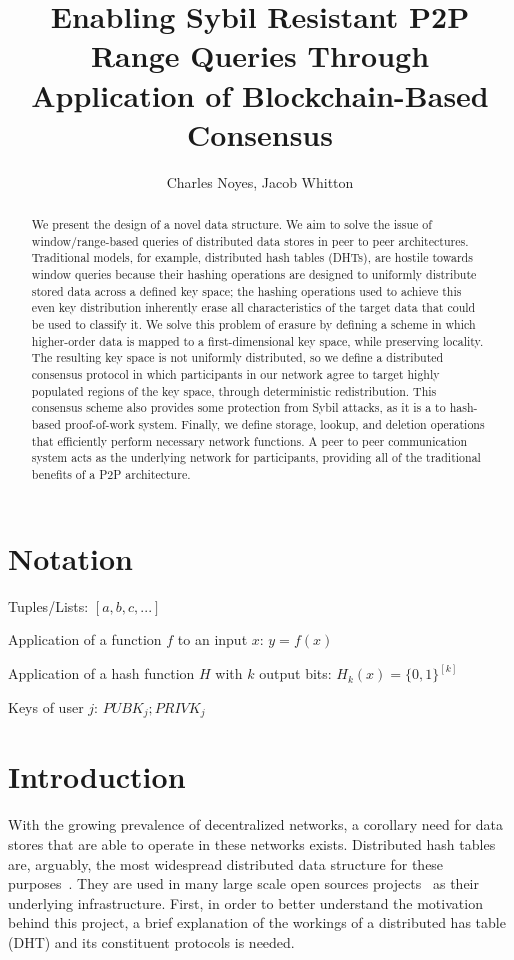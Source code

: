 \documentclass[10pt]{IEEEtran}
\title{Enabling Sybil Resistant P2P Range Queries Through Application of Blockchain-Based Consensus}
\author[1]{Charles Noyes, Jacob Whitton}
\date{\vspace{-5ex}}
\begin{document}
\maketitle

\begin{abstract}
We present the design of a novel data structure. We aim to solve the issue of window/range-based queries of distributed data stores in peer to peer architectures. Traditional models, for example, distributed hash tables (DHTs), are hostile towards window queries because their hashing operations are designed to uniformly distribute stored data across a defined key space; the hashing operations used to achieve this even key distribution inherently erase all characteristics of the target data that could be used to classify it. We solve this problem of erasure by defining a scheme in which higher-order data is mapped to a first-dimensional key space, while preserving locality. The resulting key space is not uniformly distributed, so we define a distributed consensus protocol in which participants in our network agree to target highly populated regions of the key space, through deterministic redistribution. This consensus scheme also provides some protection from Sybil attacks, as it is a to hash-based proof-of-work system. Finally, we define storage, lookup, and deletion operations that efficiently perform necessary network functions. A peer to peer communication system acts as the underlying network for participants, providing all of the traditional benefits of a P2P architecture.
\end{abstract}


\section{Notation}

\noindent Tuples/Lists: $[a,b,c,...]$

\noindent Application of a function $f$ to an input $x$: $y=f(x)$

\noindent Application of a hash function $H$ with $k$ output bits: $H_{k}(x) = \{0,1\}^{[k]}$

\noindent Keys of user $j$: $ PUBK_j; PRIVK_j $

 
\section{Introduction}
\par With the growing prevalence of decentralized networks, a corollary need for data stores that are able to operate in these networks exists. Distributed hash tables are, arguably, the most widespread distributed data structure for these purposes~\cite{Stoica:2001dj,Rowstron:2001ea,Ratnasamy:2001wn}. They are used in many large scale open sources projects~\cite{Freitas:2013tb,Xu:2010vs,Perfitt:2010fh} as their underlying infrastructure. First, in order to better understand the motivation behind this project, a brief explanation of the workings of a distributed has table (DHT) and its constituent protocols is needed.
\end{document}
